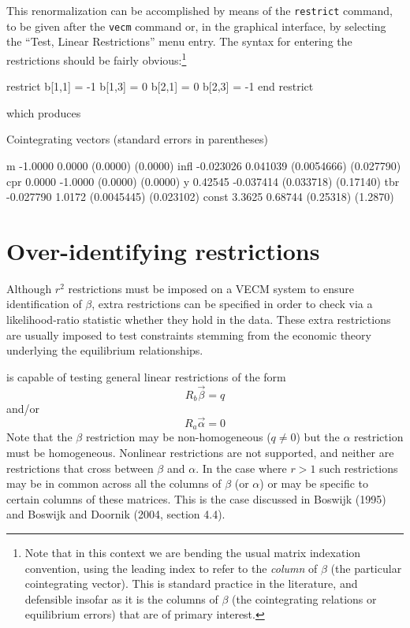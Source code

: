This renormalization can be accomplished by means of the
\texttt{restrict} command, to be given after the \texttt{vecm} command
or, in the graphical interface, by selecting the ``Test, Linear
Restrictions'' menu entry. The syntax for entering the restrictions
should be fairly obvious:\footnote{Note that in this context we are
  bending the usual matrix indexation convention, using the leading
  index to refer to the \textit{column} of $\beta$ (the particular
  cointegrating vector).  This is standard practice in the literature,
  and defensible insofar as it is the columns of $\beta$ (the
  cointegrating relations or equilibrium errors) that are of primary
  interest.}
\begin{code}
restrict
  b[1,1] = -1
  b[1,3] = 0
  b[2,1] = 0
  b[2,3] = -1
end restrict
\end{code}
which produces

\begin{code}
Cointegrating vectors (standard errors in parentheses)

m          -1.0000       0.0000 
           (0.0000)     (0.0000) 
infl     -0.023026     0.041039 
        (0.0054666)   (0.027790) 
cpr         0.0000      -1.0000 
           (0.0000)     (0.0000) 
y          0.42545    -0.037414 
         (0.033718)    (0.17140) 
tbr      -0.027790       1.0172 
        (0.0045445)   (0.023102) 
const       3.3625      0.68744 
          (0.25318)     (1.2870) 
\end{code}

\section{Over-identifying restrictions}
\label{sec:johansen-overid}

Although $r^2$ restrictions must be imposed on a VECM system to
ensure identification of $\beta$, extra restrictions can be specified
in order to check via a likelihood-ratio statistic whether they hold
in the data. These extra restrictions are usually imposed to test
constraints stemming from the economic theory underlying the
equilibrium relationships.

 is capable of testing general linear restrictions of the
form 
\begin{equation}
\label{eq:Rb}
R_b \vec{\beta} = q
\end{equation}
and/or
\begin{equation}
\label{eq:Ra}
R_a \vec{\alpha} = 0
\end{equation}
%
Note that the $\beta$ restriction may be non-homogeneous ($q \neq 0$)
but the $\alpha$ restriction must be homogeneous.  Nonlinear
restrictions are not supported, and neither are restrictions that
cross between $\beta$ and $\alpha$.  In the case where $r > 1$ such
restrictions may be in common across all the columns of $\beta$ (or
$\alpha$) or may be specific to certain columns of these matrices.
This is the case discussed in Boswijk (1995) and Boswijk and Doornik
(2004, section 4.4).

